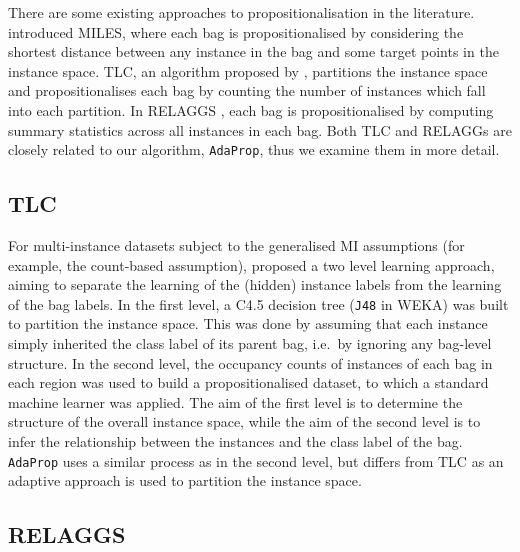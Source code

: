 \documentclass[a4paper,12pt]{report} %
\newcommand{\AdaProp}{\texttt{AdaProp}\xspace}
\begin{document}
There are some existing approaches to propositionalisation in the literature.
 introduced MILES, 
    where each bag is propositionalised by considering the shortest distance between
    any instance in the bag and some target points in the instance space.
TLC, an algorithm proposed by , partitions 
	the instance space and propositionalises each bag by counting the 
	number of instances which fall into each partition.
In RELAGGS \cite{relaggs}, each bag is propositionalised by 
    computing summary statistics across all instances in each bag.
Both TLC and RELAGGs are closely related to our algorithm, \AdaProp, 
	thus we examine them in more detail.

\subsection{TLC}    
\label{ssec:bg:tlc}

For multi-instance datasets subject to the generalised MI assumptions 
    (for example, the count-based assumption), 
     proposed a two level learning approach, 
    aiming to separate the learning of the (hidden) instance labels from
    the learning of the bag labels.
In the first level, 
    a C4.5 decision tree (\texttt{J48} in WEKA) was built to partition the instance space. 
This was done by assuming that each instance simply inherited the class label
	of its parent bag, i.e.\ by ignoring any bag-level structure.
In the second level, 
    the occupancy counts of instances of each bag in each region 
    was used to build a propositionalised dataset, 
    to which a standard machine learner was applied.
The aim of the first level is to determine the structure of the overall instance space, 
	while the aim of the second level is to infer the 
	relationship between the instances and the class label of the bag.
\AdaProp uses a similar process as  in the second level, 
    but differs from TLC as an adaptive approach is used to partition the instance space.

\subsection{RELAGGS}
\label{ssec:bg:relaggs}
\end{document}
